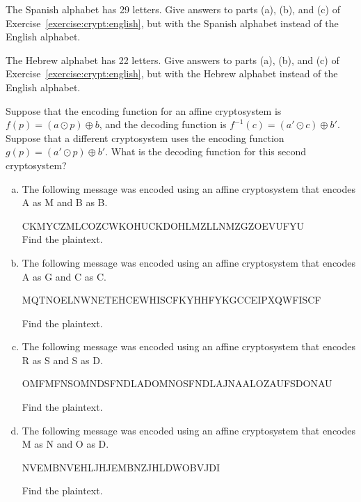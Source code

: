 \begin{exercise}{}
The Spanish alphabet has 29 letters. Give answers to parts (a), (b), and (c) of Exercise~\ref{exercise:crypt:english}, but with the Spanish alphabet instead of the English alphabet.
\end{exercise}

\begin{exercise}{}
The Hebrew alphabet has  22 letters. Give answers to parts (a), (b), and (c) of Exercise~\ref{exercise:crypt:english}, but with the Hebrew alphabet instead of the English alphabet.
\end{exercise}

\begin{exercise}{}
Suppose that the encoding function for an affine cryptosystem is $f(p) = (a \odot p) \oplus  b$, and the decoding function is 
$f^{-1}(c) = (a' \odot c) \oplus  b'$. Suppose that a different cryptosystem uses the encoding function $g(p) = (a' \odot p) \oplus  b'$. What is the decoding function for this second cryptosystem?
\end{exercise}

\begin{exercise}{}
\begin{enumerate}[(a)]
\item
The following message was encoded using an affine cryptosystem that encodes A as M and B as B. 
\medskip

CKMYCZMLCOZCWKOHUCKDOHLMZLLNMZGZOEVUFYU\\

\noindent
Find the plaintext.
\item
The following message was encoded using an affine cryptosystem that encodes A as G and C as C.
\medskip

MQTNOELNWNETEHCEWHISCFKYHHFYKGCCEIPXQWFISCF

\noindent
Find the plaintext.
\item
The following message was encoded using an affine cryptosystem that encodes R as S and S as D.
\medskip

OMFMFNSOMNDSFNDLADOMNOSFNDLAJNAALOZAUFSDONAU

\noindent
Find the plaintext.

\item
The following message was encoded using an affine cryptosystem that encodes M as N and O as D.
\medskip

NVEMBNVEHLJHJEMBNZJHLDWOBVJDI

\noindent
Find the plaintext.

\end{enumerate}
\end{exercise}

